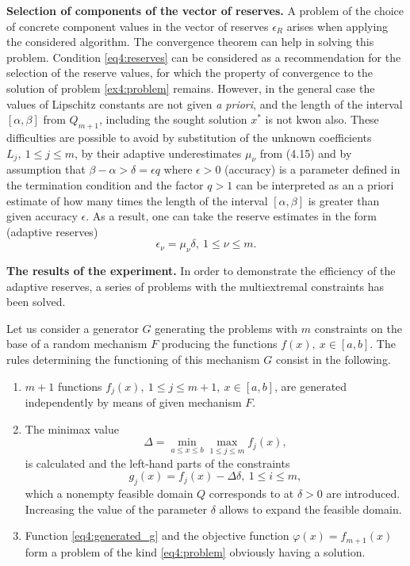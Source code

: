 \textbf{Selection of components of the vector of reserves.} A problem of the choice of concrete component values in the vector of reserves $\epsilon_R$ arises when applying the considered algorithm.
The convergence theorem can help in solving this problem. Condition \eqref{eq4:reserves} can be considered as a recommendation for the selection of the reserve values, for which the property of
convergence to the solution of problem \eqref{ex4:problem} remains. However, in the general case the values of Lipschitz constants are not given \emph{a priori}, and the length of the interval $[\alpha,\beta]$ from $Q_{m + 1}$, including the sought solution $x^*$ is not kwon also. These difficulties are possible to avoid by
substitution of the unknown coefficients $L_j,\: 1\le j\le m$, by their adaptive underestimates $\mu_\nu$ from (4.15) and by assumption that $\beta-\alpha>\delta=\epsilon q$ where $\epsilon >0$ (accuracy) is a parameter defined in the termination condition and the factor $q>1$ can be interpreted as an a priori estimate of how many times the length of the interval $[\alpha,\beta]$ is greater than given accuracy $\epsilon$. As a result, one can take
the reserve estimates in the form (adaptive reserves)
\begin{displaymath}
  \epsilon_\nu=\mu_\nu\delta,\: 1\le\nu\le m.
\end{displaymath}

\textbf{The results of the experiment.} In order to demonstrate the efficiency of the adaptive reserves, a series of problems with the multiextremal constraints has been solved.

Let us consider a generator $G$ generating the problems with $m$ constraints on the base of a random mechanism $F$ producing the functions $f(x),\: x \in [ a , b ]$. The rules determining the
functioning of this mechanism $G$ consist in the following.
\begin{enumerate}
  \item $m+1$ functions $f_j(x),\: 1\le j \le m+1,\: x\in[a,b]$, are generated independently by means of given mechanism $F$.
  \item The minimax value
  \begin{displaymath}
    \Delta=\min_{a\le x\le b}\max_{1\le j\le m}f_j(x),
  \end{displaymath}
  is calculated and the left-hand parts of the constraints
  \begin{equation}
    \label{eq4:generated_g}
    g_j(x)=f_j(x)-\Delta\delta,\: 1\le i\le m,
  \end{equation}
  which a nonempty feasible domain $Q$ corresponds to at $\delta>0$ are introduced. Increasing the value of the parameter $\delta$ allows to expand the feasible domain.
  \item Function \eqref{eq4:generated_g} and the objective function $\varphi(x)=f_{m+1}( x )$ form a problem of the kind \eqref{eq4:problem} obviously having a solution.
\end{enumerate}

